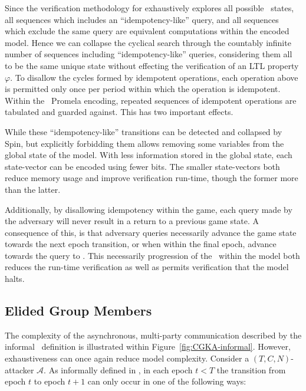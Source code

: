 Since the verification methodology for  exhaustively explores all possible \CGKAsec\ states, all sequences which includes an ``idempotency-like'' query, and all sequences which exclude the same query are equivalent computations within the encoded model.
Hence we can collapse the cyclical search through the countably infinite number of sequences including ``idempotency-like'' queries, considering them all to be the same unique state without effecting the verification of an LTL property \(\varphi\).
To disallow the cycles formed by idempotent operations, each operation above is permitted only once per period within which the operation is idempotent.
Within the \CGKAmod{}{}{}\ Promela encoding, repeated sequences of idempotent operations are tabulated and guarded against.
This has two important effects.

While these ``idempotency-like'' transitions can be detected and collapsed by Spin, but explicitly forbidding them allows removing some variables from the global state of the model.
With less information stored in the global state, each state-vector can be encoded using fewer bits.
The smaller state-vectors both reduce memory usage and improve verification run-time, though the former more than the latter.

Additionally, by disallowing idempotency within the game, each query made by the adversary will never result in a return to a previous game state.
A consequence of this, is that adversary queries necessarily advance the game state towards the next epoch transition, or when within the final epoch, advance towards the query to .
This necessarily progression of the \CGKAsec\ within the model  both reduces the run-time verification as well as permits verification that the model  halts.


\hypertarget{sec:elided-group-members}{%
\subsection{Elided Group Members}\label{sec:elided-group-members}}

The complexity of the asynchronous, multi-party communication described by the informal \CGKAsec\ definition is illustrated within Figure\ \ref{fig:CGKA-informal}.
However, exhaustiveness can once again reduce model complexity.
Consider a \((T, C, N)\)-attacker \(\mathcal{A}\).
As informally defined in \autocite{alwen2020security}, in each epoch $t < T$ the transition from epoch $t$ to epoch $t+1$ can only occur in one of the following ways:

